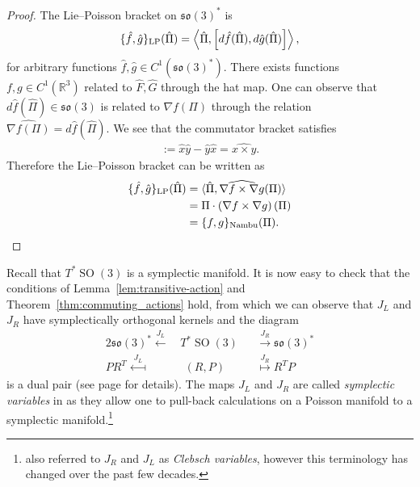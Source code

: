\documentclass[12pt]{amsart}
\newcommand{\so}{\ensuremath{\mathfrak{so}}}
\DeclareMathOperator{\SO}{SO}
\begin{document}
  \begin{proof}
    The Lie--Poisson bracket on $\so(3)^*$ is
    \begin{align*}
      \{ \hat{f} , \hat{g} \}_{\rm LP} (\hat{\Pi}) =
      \left \langle \hat{\Pi} , \left[ d\hat{f}(\hat{\Pi}) , d\hat{g}(\hat{\Pi}) \right]
        \right \rangle,
    \end{align*}
    for arbitrary functions $\hat{f},\hat{g} \in C^1(\so(3)^*)$.
    There exists functions $f,g \in C^1(\mathbb{R}^3)$ related to $\hat{F},\hat{G}$ through the hat map.
    One can observe that $d\hat{f}(\hat{\Pi}) \in \so(3)$ is 
    related to $\nabla f(\Pi)$ through the relation $\widehat{ \nabla f(\Pi)} = d\hat{f}( \hat{\Pi})$.
    We see that the commutator bracket satisfies
    \begin{align*}
      [\hat{x},\hat{y} ] := \hat{x} \hat{y} - \hat{y} \hat{x} = \widehat{x \times y }.
    \end{align*}
    Therefore the Lie--Poisson bracket can be written as
    \begin{align*}
    \{ \hat{f} , \hat{g} \}_{\rm LP}(\hat{\Pi})
    &= \langle \hat{\Pi} , \widehat{ \nabla f \times \nabla g }(\Pi) \rangle \\
    &= \Pi \cdot  \left( \nabla f \times \nabla g \right)(\Pi) \\
    &= \{ f , g \}_{\rm Nambu}(\Pi).
    \end{align*}
  \end{proof}

  Recall that $T^*\SO(3)$ is a symplectic manifold. It is now easy to
  check that the conditions of Lemma~\ref{lem:transitive-action} and
  Theorem~\ref{thm:commuting_actions} hold, from which
  we can observe that $J_L$ and $J_R$ have symplectically
  orthogonal kernels and the diagram
  \begin{alignat*}{2}
    \so(3)^* \stackrel{J_L}{\longleftarrow}&
    \,T^* \SO(3)
    &&\stackrel{J_R}{\longrightarrow} \so(3)^* \\
     PR^T \stackrel{J_L}{\longmapsfrom}&
    \;\; (R,P)
    &&\stackrel{J_R}{\longmapsto} R^TP
  \end{alignat*}
  is a dual pair
  (see page \pageref{thm:dual_pairs} for details).
  The maps $J_L$ and $J_R$ are called \emph{symplectic variables} in \cite{MarsdenWeinstein1983}
  as they allow one to pull-back calculations on a Poisson manifold to a symplectic manifold.\footnote{
  	\cite{MarsdenWeinstein1983} also referred to $J_R$ and $J_L$ as \emph{Clebsch variables},
		however this terminology has changed over the past few decades.}
\end{document}
